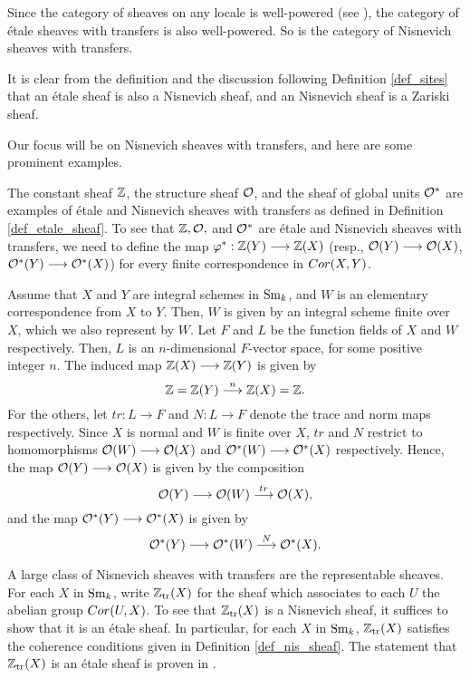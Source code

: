 Since the category of sheaves on any locale is well-powered
(see \cite[2.3.7]{Bo}), the category of \'etale sheaves 
with transfers is also well-powered. So is the category of 
Nisnevich sheaves with transfers.

It is clear from the definition and the discussion 
following Definition \ref{def_sites} that an \'etale sheaf is also 
a Nisnevich sheaf, and an Nisnevich sheaf is a Zariski sheaf.

Our focus will be on Nisnevich sheaves with transfers, and here 
are some prominent examples.

\begin{ex}\label{ex_Z_O_Ostar}
The constant sheaf $\mathbb{Z}$, the structure sheaf $\mathcal{O}$, and the sheaf
of global units $\mathcal{O}^*$ are examples of \'etale and Nisnevich sheaves
with transfers as defined in Definition
\ref{def_etale_sheaf}. To see that $\mathbb{Z}, \mathcal{O},$ and $\mathcal{O}^*$ are \'etale 
and Nisnevich sheaves with transfers, we need to define the map 
$\varphi^*: \mathbb{Z}(Y) \longrightarrow \mathbb{Z}(X)$ (resp., $\mathcal{O}(Y) \longrightarrow \mathcal{O}(X)$, $\mathcal{O}^*(Y) \longrightarrow 
\mathcal{O}^*(X)$) for every finite correspondence in $Cor(X, Y)$.

Assume that $X$ and $Y$ are integral schemes
in $\mathrm{Sm}_{k}$, and $W$ is an elementary correspondence from $X$ to $Y$. 
Then, $W$ is given by an integral scheme finite over $X$, which we 
also represent by $W$. Let $F$ and $L$ be the function fields of 
$X$ and $W$ respectively. Then, $L$ is an $n$-dimensional
$F$-vector space, for some positive integer $n$. The induced 
map $\mathbb{Z}(X) \longrightarrow \mathbb{Z}(Y)$ is given by
\[
\mathbb{Z} = \mathbb{Z}(Y) \stackrel{n}{\longrightarrow} \mathbb{Z}(X) = \mathbb{Z}.
\]
For the others, let $tr: L \to F$ and $N: L \to F$ denote the 
trace and norm maps respectively. Since $X$ is normal and $W$ is
finite over $X$, $tr$ and $N$ restrict to homomorphisms $\mathcal{O}(W) \longrightarrow 
\mathcal{O}(X)$ and $\mathcal{O}^*(W) \longrightarrow \mathcal{O}^*(X)$ respectively. Hence, the map $\mathcal{O}(Y) 
\longrightarrow \mathcal{O}(X)$ is given by the composition
\[
\mathcal{O}(Y) \longrightarrow \mathcal{O}(W) \stackrel{tr}{\longrightarrow} \mathcal{O}(X),
\]
and the map $\mathcal{O}^*(Y) \longrightarrow \mathcal{O}^*(X)$ is given by
\[
\mathcal{O}^*(Y) \longrightarrow \mathcal{O}^*(W) \stackrel{N}{\longrightarrow} \mathcal{O}^*(X).
\]
\end{ex}

\begin{ex}\label{ex_ZtrX}
A large class of Nisnevich sheaves with transfers are the 
representable sheaves. For each $X$ in $\mathrm{Sm}_{k}$, write $\mathbb{Z}_{\mathrm{tr}}(X)$
for the sheaf which associates to each $U$ the abelian group
$Cor(U, X)$. To see that $\mathbb{Z}_{\mathrm{tr}}(X)$ is a Nisnevich sheaf, it
suffices to show that it is an \'etale sheaf. In particular,
for each $X$ in $\mathrm{Sm}_{k}$, $\mathbb{Z}_{\mathrm{tr}}(X)$ satisfies the coherence 
conditions given in Definition \ref{def_nis_sheaf}. The statement that
$\mathbb{Z}_{\mathrm{tr}}(X)$ is an \'etale sheaf is proven in \cite[6.2]{MVW}.
\end{ex}


